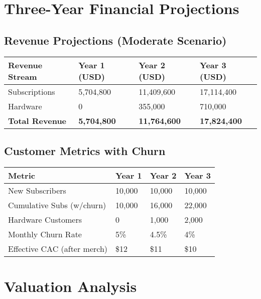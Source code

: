 \documentclass[11pt]{article}
\begin{document}
\section{Three-Year Financial Projections}

\subsection{Revenue Projections (Moderate Scenario)}
\begin{table}[H]
\centering
\begin{tabularx}{\linewidth}{l Y Y Y}
\toprule
Revenue Stream & Year 1 (USD) & Year 2 (USD) & Year 3 (USD) \\\midrule
Subscriptions & 5,704,800 & 11,409,600 & 17,114,400 \\
Hardware & 0 & 355,000 & 710,000 \\\midrule
\textbf{Total Revenue} & \textbf{5,704,800} & \textbf{11,764,600} & \textbf{17,824,400} \\
\bottomrule
\end{tabularx}
\end{table}

\subsection{Customer Metrics with Churn}
\begin{table}[H]
\centering
\begin{tabularx}{\linewidth}{l Y Y Y}
\toprule
Metric & Year 1 & Year 2 & Year 3 \\\midrule
New Subscribers & 10,000 & 10,000 & 10,000 \\
Cumulative Subs (w/churn) & 10,000 & 16,000 & 22,000 \\
Hardware Customers & 0 & 1,000 & 2,000 \\
Monthly Churn Rate\cite{recurly2024} & 5\% & 4.5\% & 4\% \\
Effective CAC (after merch) & \$12 & \$11 & \$10 \\
\bottomrule
\end{tabularx}
\end{table}

\section{Valuation Analysis}
\end{document}
